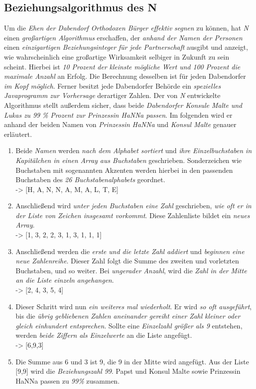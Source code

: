 \subsection{{Beziehungsalgorithmus des N}}
Um die \textit{Ehen der Dabendorf Orthodoxen Bürger effektiv segnen} zu können, hat \textit{N} einen \textit{großartigen Algorithmus} erschaffen, der \textit{anhand der Namen der Personen} einen \textit{einzigartigen Beziehungsinteger für jede Partnerschaft} ausgibt und anzeigt, wie wahrscheinlich eine großartige Wirksamkeit selbiger in Zukunft zu sein scheint. Hierbei ist \textit{10 Prozent der kleinste mögliche Wert und 100 Prozent die maximale Anzahl} an Erfolg. Die Berechnung desselben ist für jeden Dabendorfer \textit{im Kopf möglich}. Ferner besitzt jede Dabendorfer Behörde ein \textit{spezielles Javaprogramm zur Vorhersage} derartiger Zahlen. Der von \textit{N} entwickelte Algorithmus stellt außerdem sicher, dass beide \textit{Dabendorfer Konsule Malte und Lukas zu 99 \% Prozent zur Prinzessin HaNNa passen}. Im folgenden wird er anhand der beiden Namen von \textit{Prinzessin HaNNa} und \textit{Konsul Malte} genauer erläutert.\\
\begin{enumerate}[start=0]
\item Beide \textit{Namen} werden \textit{nach dem Alphabet sortiert} und \textit{ihre Einzelbuchstaben in Kapitälchen in einen Array aus Buchstaben} geschrieben. Sonderzeichen wie Buchstaben mit sogenannten Akzenten werden hierbei in den passenden Buchstaben des \textit{26 Buchstabenalphabets} geordnet.\\-> [H, A, N, N, A, M, A, L, T, E]
\item Anschließend wird \textit{unter jeden Buchstaben eine Zahl} geschrieben, \textit{wie oft er in der Liste von Zeichen insgesamt vorkommt}. Diese Zahlenliste bildet ein \textit{neues Array}.\\-> [1, 3, 2, 2, 3, 1, 3, 1, 1, 1]
\item Anschließend werden die \textit{erste und die letzte Zahl addiert} und \textit{beginnen eine neue Zahlenreihe}. Dieser Zahl folgt die Summe des zweiten und vorletzten Buchstaben, und so weiter. Bei \textit{ungerader Anzahl}, wird die \textit{Zahl in der Mitte an die Liste einzeln angehangen}.\\-> [2, 4, 3, 5, 4]
\item Dieser Schritt wird nun \textit{ein weiteres mal wiederholt}. Er wird \textit{so oft ausgeführt}, bis die \textit{übrig gebliebenen Zahlen aneinander gereiht einer Zahl kleiner oder gleich einhundert entsprechen}. Sollte eine \textit{Einzelzahl größer als 9} entstehen, werden \textit{beide Ziffern als Einzelwerte} an die Liste angefügt.\\-> [6,9,3]
\item Die Summe aus 6 und 3 ist 9, die 9 in der Mitte wird angefügt. Aus der Liste [9,9] wird die \textit{Beziehungszahl 99}. Papst und Konsul Malte sowie Prinzessin HaNNa passen zu \textit{99\%} zusammen.
\end{enumerate}

